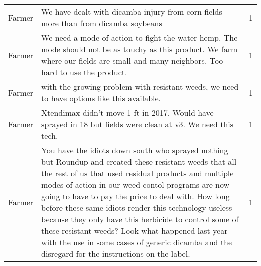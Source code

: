 \documentclass[]{article}
\begin{document}
\begin{table}[H]
\begin{tabular}{llr}
Farmer & We have dealt with dicamba injury from corn fields more than from dicamba soybeans & 1\\
\addlinespace
Farmer & We need a mode of action to fight the water hemp. The mode should not be as touchy as this product.  We farm where our fields are small and many neighbors. Too hard to use the product. & 1\\
Farmer & with the growing problem with resistant weeds, we need to have options like this available. & 1\\
Farmer & Xtendimax didn't move 1 ft in 2017. Would have sprayed in 18 but fields were clean at v3. We need this tech. & 1\\
Farmer & You have the idiots down south who sprayed nothing but Roundup and created these resistant weeds that all the rest of us that used residual products and multiple modes of action in our weed contol programs are now going to have to pay the price to deal with. How long before these same idiots render this technology useless because they only have this herbicide to control some of these resistant weeds? Look what happened last year with the use in some cases of generic dicamba  and the disregard for the instructions on the label. & 1\\
\bottomrule
\end{tabular}
\end{table}
\end{document}

